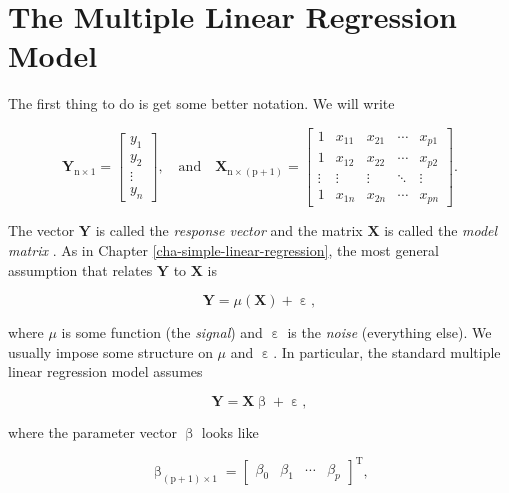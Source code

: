 \documentclass[]{book}
\numberwithin{equation}{chapter}
\numberwithin{figure}{chapter}
\theoremstyle{plain}
\theoremstyle{definition}
\theoremstyle{remark}
\theoremstyle{definition}
\theoremstyle{definition}
\theoremstyle{remark}
\begin{document}
\section{The Multiple Linear Regression Model}\label{sec-the-mlr-model}

The first thing to do is get some better notation. We will write

\begin{equation}
\mathbf{Y}_{\mathrm{n}\times1}=
\begin{bmatrix}y_{1}\\
y_{2}\\
\vdots\\
y_{n}
\end{bmatrix},
\quad \mbox{and}\quad \mathbf{X}_{\mathrm{n}\times(\mathrm{p}+1)}=
\begin{bmatrix}1 & x_{11} & x_{21} & \cdots & x_{p1}\\
1 & x_{12} & x_{22} & \cdots & x_{p2}\\
\vdots & \vdots & \vdots & \ddots & \vdots\\
1 & x_{1n} & x_{2n} & \cdots & x_{pn}
\end{bmatrix}.
\end{equation}

The vector \(\mathbf{Y}\) is called the \emph{response vector}
 and the matrix \(\mathbf{X}\) is called the
\emph{model matrix} . As in Chapter
\ref{cha-simple-linear-regression}, the most general assumption that
relates \(\mathbf{Y}\) to \(\mathbf{X}\) is

\begin{equation}
\mathbf{Y}=\mu(\mathbf{X})+\upepsilon,
\end{equation}

where \(\mu\) is some function (the \emph{signal}) and \(\upepsilon\) is
the \emph{noise} (everything else). We usually impose some structure on
\(\mu\) and \(\upepsilon\). In particular, the standard multiple linear
regression model  assumes

\begin{equation}
\mathbf{Y}=\mathbf{X}\upbeta+\upepsilon,
\end{equation}

where the parameter vector \(\upbeta\) looks like

\begin{equation}
\upbeta_{(\mathrm{p}+1)\times1}=\begin{bmatrix}\beta_{0} & \beta_{1} & \cdots & \beta_{p}\end{bmatrix}^{\mathrm{T}},
\end{equation}
\end{document}
